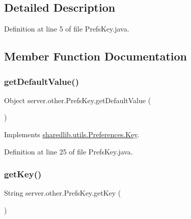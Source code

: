 \subsection{Detailed Description}


Definition at line 5 of file Prefs\+Key.\+java.



\subsection{Member Function Documentation}
\hypertarget{enumserver_1_1other_1_1_prefs_key_a351b0589a30646eb7cd76560905cbc1a}{}\label{enumserver_1_1other_1_1_prefs_key_a351b0589a30646eb7cd76560905cbc1a} 
\subsubsection{\texorpdfstring{get\+Default\+Value()}{getDefaultValue()}}
{\footnotesize\ttfamily Object server.\+other.\+Prefs\+Key.\+get\+Default\+Value (\begin{DoxyParamCaption}{ }\end{DoxyParamCaption})}



Implements \hyperlink{interfacesharedlib_1_1utils_1_1_preferences_1_1_key_ab68710164c21a369f40429b1d41eb59e}{sharedlib.\+utils.\+Preferences.\+Key}.



Definition at line 25 of file Prefs\+Key.\+java.

\hypertarget{enumserver_1_1other_1_1_prefs_key_ad5cccedaf5ffa4e7cadbb08e025c2dbc}{}\label{enumserver_1_1other_1_1_prefs_key_ad5cccedaf5ffa4e7cadbb08e025c2dbc} 
\subsubsection{\texorpdfstring{get\+Key()}{getKey()}}
{\footnotesize\ttfamily String server.\+other.\+Prefs\+Key.\+get\+Key (\begin{DoxyParamCaption}{ }\end{DoxyParamCaption})}



